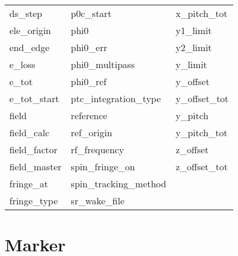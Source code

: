 \begin{tabular}{lll}
ds_step                     & p0c_start                   & x_pitch_tot                 \\
ele_origin                  & phi0                        & y1_limit                    \\
end_edge                    & phi0_err                    & y2_limit                    \\
e_loss                      & phi0_multipass              & y_limit                     \\
e_tot                       & phi0_ref                    & y_offset                    \\
e_tot_start                 & ptc_integration_type        & y_offset_tot                \\
field                       & reference                   & y_pitch                     \\
field_calc                  & ref_origin                  & y_pitch_tot                 \\
field_factor                & rf_frequency                & z_offset                    \\
field_master                & spin_fringe_on              & z_offset_tot                \\
fringe_at                   & spin_tracking_method        &                             \\
fringe_type                 & sr_wake_file                &                             \\
 \bottomrule
 \end{tabular}
 \vfill
 
 \section{Marker}
 \label{s:list.marker}
 

